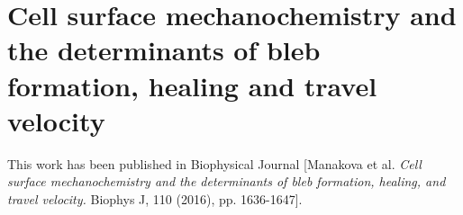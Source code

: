 \renewcommand{\thefootnote}{$\star$} 
\chapter[Cellular blebs]{Cell surface mechanochemistry and the determinants of bleb formation, healing and travel velocity}\label{chap:cellbleb}












\vfill
This work has been published in Biophysical Journal [Manakova et al. \textit{Cell surface mechanochemistry and the determinants of bleb formation, healing, and travel velocity.} Biophys J, 110 (2016), pp. 1636-1647].